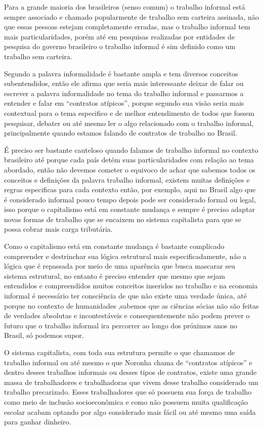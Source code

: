 Para a grande maioria dos brasileiros (senso comum) o trabalho informal está sempre associado e chamado 
popularmente de trabalho sem carteira assinada, não que essas pessoas estejam completamente erradas, 
mas o trabalho informal tem mais particularidades, porém até em pesquisas realizadas por entidades de 
pesquisa do governo brasileiro o trabalho informal é sim definido como um trabalho sem carteira.

Segundo \cite{noronha2003informal} a palavra informalidade é bastante ampla e tem diversos conceitos subentendidos, 
então ele afirma que seria mais interessante deixar de falar ou escrever a palavra informalidade no 
tema do trabalho informal e passarmos a entender e falar em ``contratos atípicos'', porque segundo sua 
visão seria mais contextual para o tema especifico e de melhor entendimento de todos que fossem 
pesquisar, debater ou até mesmo ler o algo relacionado com o trabalho informal, principalmente quando 
estamos falando de contratos de trabalho no Brasil.

É preciso ser bastante cauteloso quando falamos de trabalho informal no contexto brasileiro até porque 
cada país detém suas particularidades com relação ao tema abordado, então não devemos cometer o equivoco 
de achar que sabemos todos os conceitos e definições da palavra trabalho informal, existem muitas definições 
e regras especificas para cada contexto então, por exemplo, aqui no Brasil algo que é considerado informal 
pouco tempo depois pode ser considerado formal ou legal, isso porque o capitalismo está em constante mudança 
e sempre é preciso adaptar novas formas de trabalho que se encaixem no sistema capitalista para que se possa 
cobrar mais carga tributária. 

Como o capitalismo está em constante mudança é bastante complicado compreender 
e destrinchar sua lógica estrutural mais especificadamente, não a lógica que é repassada por meio de uma 
aparência que busca mascarar seu sistema estrutural, no entanto é preciso entender que mesmo que sejam entendidos 
e compreendidos muitos conceitos inseridos no trabalho e na economia informal é necessário ter consciência de 
que não existe uma verdade única, até porque no contexto de humanidades ,sabemos que as ciências sócias não
são feitas de verdades absolutas e incontestáveis e consequentemente não podem prever o futuro que o trabalho 
informal ira percorrer ao longo dos próximos anos no Brasil, só podemos supor.

O sistema capitalista, com toda sua estrutura permite o que chamamos de trabalho informal ou até mesmo o que 
Noronha chama de “contratos atípicos” e dentro desses trabalhos informais ou desses tipos de contratos, existe 
uma grande massa de trabalhadores e trabalhadoras que vivem desse trabalho considerado um trabalho precarizado. 
Esses trabalhadores que só possuem sua força de trabalho como meio de inclusão socioeconômica e como não possuem
muita qualificação escolar acabam optando por algo considerado mais fácil ou até mesmo uma saída para ganhar dinheiro. 

